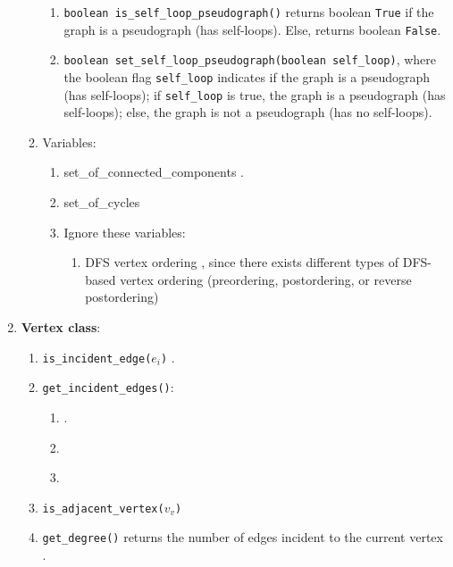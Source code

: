 \begin{enumerate}
\begin{enumerate}
\begin{enumerate}
		\item {\tt boolean is\_self\_loop\_pseudograph()} returns boolean {\tt True} if the graph is a pseudograph (has self-loops). Else, returns boolean {\tt False}.
		\item {\tt boolean set\_self\_loop\_pseudograph(boolean self\_loop)}, where the boolean flag {\tt self\_loop} indicates if the graph is a pseudograph (has self-loops); if {\tt self\_loop} is true, the graph is a pseudograph (has self-loops); else, the graph is not a pseudograph (has no self-loops).
		\end{enumerate}
	\item Variables: \vspace{-0.2cm}
		\begin{enumerate} \itemsep -2pt
		\item set\_of\_connected\_components \cite[\S53, pp. 857]{Goldman2008}.
		\item set\_of\_cycles
		\item Ignore these variables: \vspace{-0.1cm}
			\begin{enumerate} \itemsep -1pt
			\item DFS vertex ordering \cite[\S53, pp. 857]{Goldman2008}, since there exists different types of DFS-based vertex ordering (preordering, postordering, or reverse postordering) \cite{WikipediaContributors2018a51}
			\end{enumerate}
		\end{enumerate}
	\end{enumerate}
\item {\bf Vertex class}: \vspace{-0.3cm}
	\begin{enumerate} \itemsep -2pt
	\item {\tt is\_incident\_edge($e_{i}$)} \cite[\S13.1.1, pp. 599]{Goodrich2011}.
	\item {\tt get\_incident\_edges()}: \vspace{-0.2cm}
		\begin{enumerate} \itemsep -2pt
		\item \cite[\S14.1.1, pp. 626]{Goodrich2013}.
		\item \cite[\S13.1.1, pp. 599]{Goodrich2011}
		\item \cite[\S52.5, pp. 851]{Goldman2008}
		\end{enumerate}
	\item {\tt is\_adjacent\_vertex($v_{v}$)} \cite[\S13.1.1, pp. 599]{Goodrich2011}
	\item {\tt get\_degree()} returns the number of edges incident to the current vertex \cite[\S14.1.1, pp. 626]{Goodrich2013}.

\end{enumerate}
\end{enumerate}
